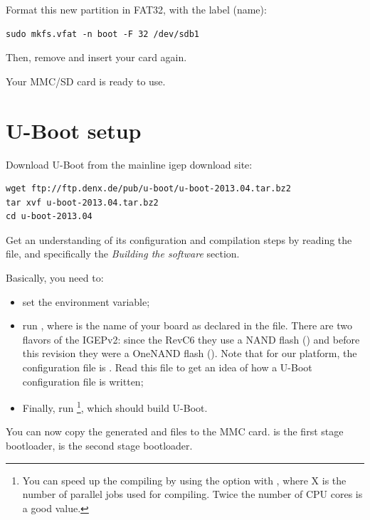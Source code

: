 Format this new partition in FAT32, with the  label (name):

\begin{verbatim}
sudo mkfs.vfat -n boot -F 32 /dev/sdb1
\end{verbatim}

Then, remove and insert your card again.

Your MMC/SD card is ready to use.

\section{U-Boot setup}

Download U-Boot from the mainline igep download site:

\begin{verbatim}
wget ftp://ftp.denx.de/pub/u-boot/u-boot-2013.04.tar.bz2
tar xvf u-boot-2013.04.tar.bz2
cd u-boot-2013.04
\end{verbatim}

Get an understanding of its configuration and compilation steps by
reading the  file, and specifically the {\em Building the
  software} section.

Basically, you need to:

\begin{itemize}

\item set the  environment variable;

\item run , where  is the name
  of your board as declared in the  file. There are
  two flavors of the IGEPv2: since the RevC6 they use a NAND flash
  () and before this revision they were a OneNAND flash
  (). Note that for our platform, the configuration
  file is . Read this file to get an
  idea of how a U-Boot configuration file is written;

\item Finally, run \footnote{You can speed up the compiling
  by using the  option with , where X is the number of parallel
  jobs used for compiling. Twice the number of CPU cores is a good
  value.}, which should build U-Boot.

\end{itemize}

You can now copy the generated  and  files
to the MMC card.  is the first stage bootloader,
 is the second stage bootloader.

